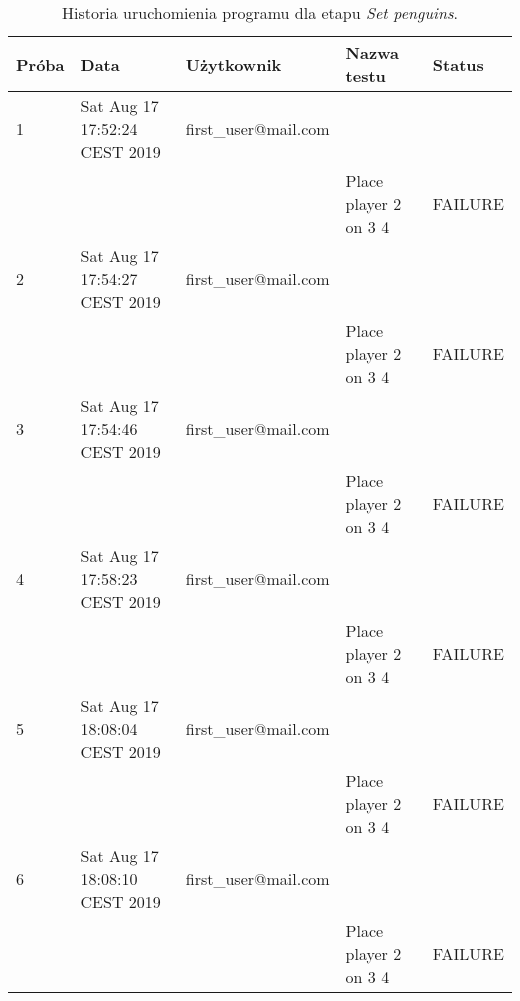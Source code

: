 \scriptsize
\begin{center}
    \begin{longtable}{|l|l|l|l|l|}
        \caption{Historia uruchomienia programu dla etapu \textit{Set penguins}.}
        \label{tab:set_penguins} \\\hline
        \hline
        \rowcolor[HTML]{EFEFEF}
        \textbf{Próba} & \textbf{Data}                 & \textbf{Użytkownik}             & \textbf{Nazwa testu}             & \textbf{Status} \\ \hline
         1 &      Sat Aug 17 17:52:24 CEST 2019 & first\_user@mail.com &                                  &                 \\ \hline
         &      &                                 & Place player 2 on 3 4            & FAILURE         \\ \hline
         2 &      Sat Aug 17 17:54:27 CEST 2019 & first\_user@mail.com &                                  &                 \\ \hline
         &      &                                 & Place player 2 on 3 4            & FAILURE         \\ \hline
         3 &      Sat Aug 17 17:54:46 CEST 2019 & first\_user@mail.com &                                  &                 \\ \hline
         &      &                                 & Place player 2 on 3 4            & FAILURE         \\ \hline
         4 &      Sat Aug 17 17:58:23 CEST 2019 & first\_user@mail.com &                                  &                 \\ \hline
         &      &                                 & Place player 2 on 3 4            & FAILURE         \\ \hline
         5 &      Sat Aug 17 18:08:04 CEST 2019 & first\_user@mail.com &                                  &                 \\ \hline
         &      &                                 & Place player 2 on 3 4            & FAILURE         \\ \hline
         6 &      Sat Aug 17 18:08:10 CEST 2019 & first\_user@mail.com &                                  &                 \\ \hline
         &      &                                 & Place player 2 on 3 4            & FAILURE         \\ \hline

\end{longtable}
\end{center}
